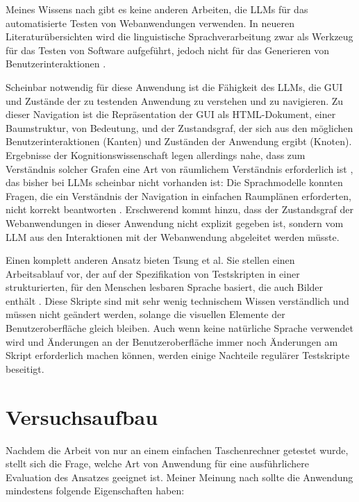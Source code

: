 Meines Wissens nach gibt es keine anderen Arbeiten, die LLMs für das automatisierte Testen von Webanwendungen verwenden.
In neueren Literaturübersichten wird die linguistische Sprachverarbeitung zwar als Werkzeug für das Testen von Software aufgeführt, jedoch nicht für das Generieren von Benutzerinteraktionen \cite{implementation_verma_2023, machine_fontes_2021}.

Scheinbar notwendig für diese Anwendung ist die Fähigkeit des LLMs, die GUI und Zustände der zu testenden Anwendung zu verstehen und zu navigieren.
Zu dieser Navigation ist die Repräsentation der GUI als HTML-Dokument, einer Baumstruktur, von Bedeutung, und der Zustandsgraf, der sich aus den möglichen Benutzerinteraktionen (Kanten) und Zuständen der Anwendung ergibt (Knoten).
Ergebnisse der Kognitionswissenschaft legen allerdings nahe, dass zum Verständnis solcher Grafen eine Art von räumlichem Verständnis erforderlich ist \cite{what_is_a_cognitive_map}, das bisher bei LLMs scheinbar nicht vorhanden ist:
Die Sprachmodelle konnten Fragen, die ein Verständnis der Navigation in einfachen Raumplänen erforderten, nicht korrekt beantworten \cite{cogmaps_llm}.
Erschwerend kommt hinzu, dass der Zustandsgraf der Webanwendungen in dieser Anwendung nicht explizit gegeben ist, sondern vom LLM aus den Interaktionen mit der Webanwendung abgeleitet werden müsste.

Einen komplett anderen Ansatz bieten Tsung et al.
Sie stellen einen Arbeitsablauf vor, der auf der Spezifikation von Testskripten in einer strukturierten, für den Menschen lesbaren Sprache basiert, die auch Bilder enthält \cite{tsung}.
Diese Skripte sind mit sehr wenig technischem Wissen verständlich und müssen nicht geändert werden, solange die visuellen Elemente der Benutzeroberfläche gleich bleiben.
Auch wenn keine natürliche Sprache verwendet wird und Änderungen an der Benutzeroberfläche immer noch Änderungen am Skript erforderlich machen können, werden einige Nachteile regulärer Testskripte beseitigt.


\chapter{Versuchsaufbau}
\label{ch:ExperimentalSetup}

Nachdem die Arbeit von  nur an einem einfachen Taschenrechner getestet wurde, stellt sich die Frage, welche Art von Anwendung für eine ausführlichere Evaluation des Ansatzes geeignet ist.
Meiner Meinung nach sollte die Anwendung mindestens folgende Eigenschaften haben:

